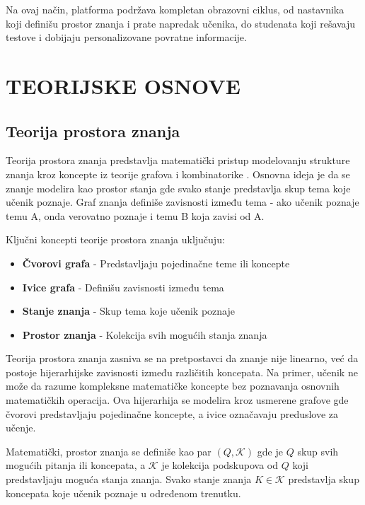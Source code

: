 \documentclass[conference]{IEEEtran}
\begin{document}
Na ovaj način, platforma podržava kompletan obrazovni ciklus, od nastavnika koji definišu prostor znanja i prate napredak učenika, do studenata koji rešavaju testove i dobijaju personalizovane povratne informacije.



\section{TEORIJSKE OSNOVE}

\subsection{Teorija prostora znanja}

Teorija prostora znanja predstavlja matematički pristup modelovanju strukture znanja kroz koncepte iz teorije grafova i kombinatorike \cite{doignon1999}. Osnovna ideja je da se znanje modelira kao prostor stanja gde svako stanje predstavlja skup tema koje učenik poznaje. Graf znanja definiše zavisnosti između tema - ako učenik poznaje temu A, onda verovatno poznaje i temu B koja zavisi od A.

Ključni koncepti teorije prostora znanja uključuju:
\begin{itemize}
\item \textbf{Čvorovi grafa} - Predstavljaju pojedinačne teme ili koncepte
\item \textbf{Ivice grafa} - Definišu zavisnosti između tema
\item \textbf{Stanje znanja} - Skup tema koje učenik poznaje
\item \textbf{Prostor znanja} - Kolekcija svih mogućih stanja znanja
\end{itemize}

Teorija prostora znanja zasniva se na pretpostavci da znanje nije linearno, već da postoje hijerarhijske zavisnosti između različitih koncepata. Na primer, učenik ne može da razume kompleksne matematičke koncepte bez poznavanja osnovnih matematičkih operacija. Ova hijerarhija se modelira kroz usmerene grafove gde čvorovi predstavljaju pojedinačne koncepte, a ivice označavaju preduslove za učenje.

Matematički, prostor znanja se definiše kao par $(Q, \mathcal{K})$ gde je $Q$ skup svih mogućih pitanja ili koncepata, a $\mathcal{K}$ je kolekcija podskupova od $Q$ koji predstavljaju moguća stanja znanja. Svako stanje znanja $K \in \mathcal{K}$ predstavlja skup koncepata koje učenik poznaje u određenom trenutku.
\end{document}
